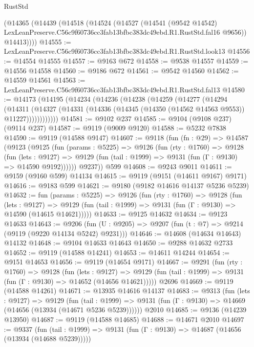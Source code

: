\begin{lexlean}{RustStd}
\begin{coremodule}
    (@14365
      (@14439
        (@14518
          (@14524
            (@14527
              (@14541
                (@9542 @14542)
                LexLeanPreserve.C56c9f60736cc3fab13bfbc383dc49ebd.R1.RustStd.fal16
                @9656))
            @14413))))
@14555 := LexLeanPreserve.C56c9f60736cc3fab13bfbc383dc49ebd.R1.RustStd.look13
@14556 := @14554 @14555
@14557 := @9163 @672
@14558 := @9538 @14557
@14559 := @14556 @14558
@14560 := @9186 @672
@14561 := @9542 @14560
@14562 := @14559 @14561
@14563 := LexLeanPreserve.C56c9f60736cc3fab13bfbc383dc49ebd.R1.RustStd.fal13
@14580 := @14173
    (@14195
      (@14234
        (@14236
          (@14238
            (@14259
              (@14277
                (@14294
                  (@14311
                    (@14327
                      (@14331 (@14336 (@14345 (@14350 (@14562 @14563 @9553)) @11227))))))))))))
@14581 := @9102 @237
@14585 := @9104 (@9108 @237) (@9114 @237)
@14587 := @9119 (@9009 @9120)
@14588 := @5232 @7838
@14590 := @9119 (@14588 @9147)
@14607 := @9118
    (fun (fn : @29) =>
    @14587
      (@9123
        (@9125
          (fun (params : @5225) =>
          @9126
            (fun (rty : @1760) =>
            @9128
              (fun (lets : @9127) =>
              @9129 (fun (tail : @1999) => @9131 (fun (Γ : @9130) => @14590 @9192))))))
        @9237))
    @599
@14608 := @9243 @9011
@14611 := @9159 (@9160 @599) @14134
@14615 := @9119 (@9151 (@14611 @9167) @9171)
@14616 := @9183 @599
@14621 := @9180 (@9182 @14616 @14137 @5236 @5239)
@14632 := fun (params : @5225) =>
  @9126
    (fun (rty : @1760) =>
    @9128
      (fun (lets : @9127) =>
      @9129 (fun (tail : @1999) => @9131 (fun (Γ : @9130) => @14590 (@14615 @14621)))))
@14633 := @9125 @14632
@14634 := @9123 @14633
@14643 := @9206
    (fun (U : @9205) => @9207 (fun (t : @7) => @9214 (@9119 (@9220 @14134 @5242) @9231)))
@14646 := @14608 (@14634 @14643) @14132
@14648 := @9104 @14633 @14643
@14650 := @9288 @14632 @2733
@14652 := @9119 (@14588 @14241)
@14653 := @14611 @14244
@14654 := @9151 @14653
@14656 := @9119 (@14654 @9171)
@14667 := @9291
    (fun (rty : @1760) =>
    @9128
      (fun (lets : @9127) =>
      @9129 (fun (tail : @1999) => @9131 (fun (Γ : @9130) => @14652 (@14656 @14621)))))
    @2696
@14669 := @9119 (@14588 @14261)
@14671 := @13935 @14616 @14137
@14683 := @9313
    (fun (lets : @9127) =>
    @9129
      (fun (tail : @1999) =>
      @9131 (fun (Γ : @9130) => @14669 (@14656 (@13934 (@14671 @5236 @5239))))))
    @2010
@14685 := @9136 (@14239 @13950)
@14687 := @9119 (@14588 @14685)
@14688 := @14671 @2010
@14697 := @9337
    (fun (tail : @1999) => @9131 (fun (Γ : @9130) => @14687 (@14656 (@13934 (@14688 @5239)))))

\end{coremodule}
\end{lexlean}
